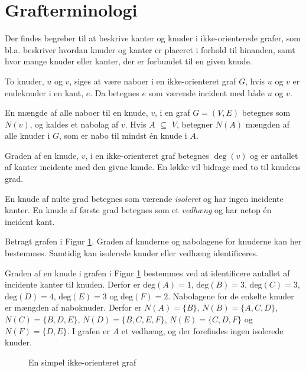 \usetikzlibrary{arrows, positioning}
\section{Grafterminologi}

Der findes begreber til at beskrive kanter og knuder i ikke-orienterede grafer, som bl.a. beskriver hvordan knuder og kanter er placeret i forhold til hinanden, samt hvor mange knuder eller kanter, der er forbundet til en given knude.

\begin{defn}
To knuder, $u$ og $v$, siges at være naboer i en ikke-orienteret graf $G$, hvis $u$ og $v$ er endeknuder i en kant, $e$. Da betegnes $e$ som værende incident med både $u$ og $v$.
\end{defn}

\begin{defn}
En mængde af alle naboer til en knude, $v$, i en graf $G=(V,E)$ betegnes som $N(v)$, og kaldes et nabolag af $v$. Hvis $A$ $\subseteq$ $V$, betegner $N(A)$ mængden af alle knuder i $G$, som er nabo til mindst én knude i $A$.
\end{defn}

\begin{defn}
Graden af en knude, $v$, i en ikke-orienteret graf betegnes $\deg(v)$ og er antallet af kanter incidente med den givne knude.  En løkke vil bidrage med to til knudens grad. 
\end{defn}

En knude af nulte grad betegnes som værende \textit{isoleret} og har ingen incidente kanter. En knude af første grad betegnes som et \textit{vedhæng} og har netop én incident kant.

\begin{exmp}
Betragt grafen i Figur \ref{eksempel_nabo}. Graden af knuderne og nabolagene for knuderne kan her bestemmes. Samtidig kan isolerede knuder eller vedhæng identificeres.

Graden af en knude i grafen i Figur \ref{eksempel_nabo} bestemmes ved at identificere antallet af incidente kanter til knuden. Derfor er $\textrm{deg}(A)=1$, $\textrm{deg}(B)=3$, $\textrm{deg}(C)=3$, $\textrm{deg}(D)=4$, $\textrm{deg}(E)=3$ og $\textrm{deg}(F)=2$. 
Nabolagene for de enkelte knuder er mængden af naboknuder. 
Derfor er $N(A)=\lbrace B \rbrace$, $N(B)=\lbrace A, C, D \rbrace$, $N(C)=\lbrace B, D, E \rbrace$, $N(D)=\lbrace B, C, E, F \rbrace$, $N(E)=\lbrace C, D, F \rbrace$ og $N(F)=\lbrace D, E \rbrace$. 
I grafen er $A$ et vedhæng, og der forefindes ingen isolerede knuder.

\begin{figure}[h!]
	\centering
	
	\caption{En simpel ikke-orienteret graf} \label{eksempel_nabo}
\end{figure}
\end{exmp}

